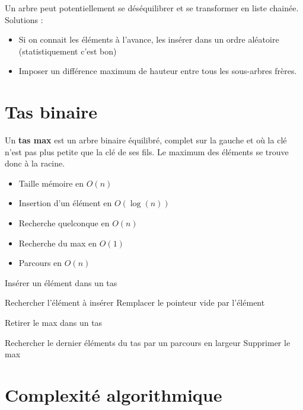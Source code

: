 \documentclass[11pt,a4paper]{report}
\begin{document}
Un arbre peut potentiellement se déséquilibrer et se transformer en liste chainée. Solutions :
\begin{itemize}
    \item Si on connait les éléments à l'avance, les insérer dans un ordre aléatoire (statistiquement c'est bon)
    \item Imposer un différence maximum de hauteur entre tous les sous-arbres frères.
\end{itemize}

\section{Tas binaire}
Un \textbf{tas max} est un arbre binaire équilibré, complet sur la gauche et où la clé n'est pas plus petite que la clé de ses fils. Le maximum des éléments se trouve donc à la racine.

\begin{itemize}
    \item Taille mémoire en $O(n)$
    \item Insertion d'un élément en $O(\log(n))$
    \item Recherche quelconque en $O(n)$
    \item Recherche du max en $O(1)$
    \item Parcours en $O(n)$
\end{itemize}

\begin{algorithm}[H]
\caption{Insérer un élément dans un tas}
Rechercher l'élément à insérer
Remplacer le pointeur vide par l'élément\;
\end{algorithm}

\begin{algorithm}[H]
\caption{Retirer le max dans un tas}
Rechercher le dernier éléments du tas par un parcours en largeur\;
Supprimer le max\;
\end{algorithm}

\section{Complexité algorithmique}
\end{document}
